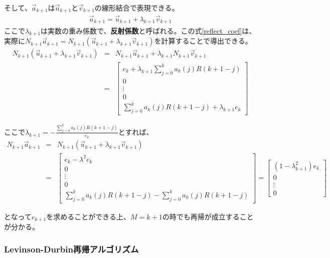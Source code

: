 \documentclass[uplatex,dvipdfmx,b5j,10pt]{jsbook}
\theoremstyle{definition}
\begin{document}
そして、$\vec{a}_{k+1}$は$\vec{u}_{k+1}$と$\vec{v}_{k+1}$の線形結合で表現できる。
\begin{eqnarray}
  \vec{a}_{k+1} = \vec{u}_{k+1} + \lambda_{k+1} \vec{v}_{k+1} \label{reflect_coef}
\end{eqnarray}
ここで$\lambda_{k+1}$は実数の重み係数で、\textbf{反射係数}と呼ばれる。この式\ref{reflect_coef}は、実際に$N_{k+1}\vec{a}_{k+1} = N_{k+1}(\vec{u}_{k+1} + \lambda_{k+1} \vec{v}_{k+1})$を計算することで導出できる。
\begin{eqnarray*}
  N_{k+1}(\vec{u}_{k+1} + \lambda_{k+1} \vec{v}_{k+1}) &=& N_{k+1}\vec{u}_{k+1} + \lambda_{k+1} N_{k+1} \vec{v}_{k+1} \\
  &=& 
  \begin{bmatrix}
    e_{k} + \lambda_{k+1} \displaystyle\sum_{j=0}^{k} a_{k}(j) R(k+1-j) \\ 0 \\ \vdots \\ 0 \\ \displaystyle\sum_{j=0}^{k} a_{k}(j) R(k+1-j) + \lambda_{k+1} e_{k}
  \end{bmatrix} 
\end{eqnarray*}

ここで$\lambda_{k+1} = - \displaystyle\frac{\sum_{j=0}^{k} a_{k}(j) R(k+1-j)}{e_{k}}$とすれば、
\begin{eqnarray*}
  N_{k+1}\vec{a}_{k+1} &=& N_{k+1}(\vec{u}_{k+1} + \lambda_{k+1} \vec{v}_{k+1}) \\
  &=& 
  \begin{bmatrix}
    e_{k} - \lambda^{2} e_{k} \\ 0 \\ \vdots \\ 0 \\ \displaystyle\sum_{j=0}^{k} a_{k}(j) R(k+1-j) - \displaystyle\sum_{j=0}^{k} a_{k}(j) R(k+1-j)
  \end{bmatrix}=
  \begin{bmatrix}
    (1-\lambda_{k+1}^{2}) e_{k} \\ 0 \\ \vdots  \\ 0
  \end{bmatrix}
\end{eqnarray*}

となって$e_{k+1}$を求めることができる上、$M=k+1$の時でも再帰が成立することが分かる。

\subsubsection{Levinson-Durbin再帰アルゴリズム}
\end{document}
